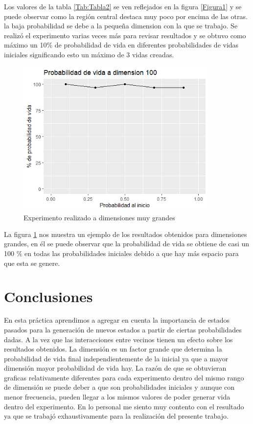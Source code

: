 \documentclass{article}
\begin{document}
Los valores de la tabla \ref{Tab:Tabla2} se ven reflejados en la figura \ref{Figura1}  y se puede observar como la región central destaca muy poco por encima de las otras. la baja probabilidad se debe a la pequeña dimension con la que se trabajo. Se realizó el experimento varias veces más para revisar resultados y se obtuvo como máximo un 10\% de probabilidad de vida en diferentes probabilidades de vidas iniciales significando esto un máximo de 3 vidas creadas. 

\begin{figure} [h!]%
    \centering
    \includegraphics[width=100mm]{Figura2.png} %
    \caption{Experimento realizado a dimensiones muy grandes}
    \label{Figura2}
\end{figure}

La figura \ref{Figura2} nos muestra un ejemplo de los resultados obtenidos para dimensiones grandes, en él se puede observar que la probabilidad de vida se obtiene de casi un 100 \% en todas las probabilidades iniciales debido a que hay más espacio para que esta se genere.

\section{Conclusiones}
En esta práctica aprendimos a agregar en cuenta la importancia de estados pasados para la generación de nuevos estados a partir de ciertas probabilidades dadas. A la vez que las interacciones entre vecinos tienen un efecto sobre los resultados obtenidos. La dimensión es un factor grande que determina la probabilidad de vida final independientemente de la inicial ya que a mayor dimensión mayor probabilidad de vida hay. La razón de que se obtuvieran graficas relativamente diferentes para cada experimento dentro del mismo rango de dimensión se puede deber a que son probabilidades iniciales y aunque con menor frecuencia, pueden llegar a los mismos valores de poder generar vida dentro del experimento. En lo personal me siento muy contento con el resultado ya que se trabajó exhaustivamente para la realización del presente trabajo.



\end{document}

